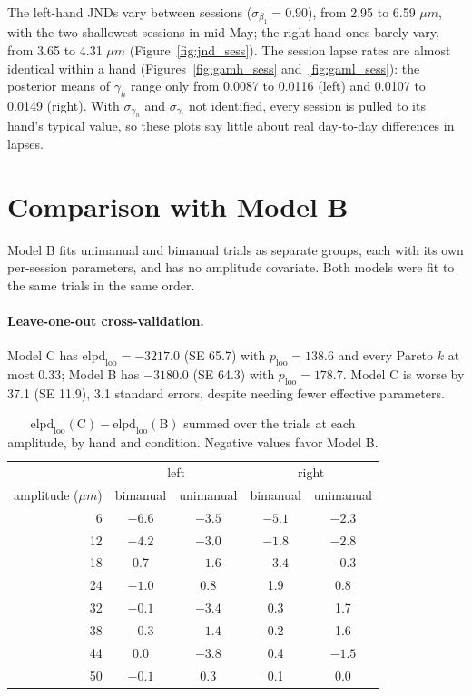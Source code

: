 \documentclass[11pt]{article}
\begin{document}
The left-hand JNDs vary between sessions ($\sigma_{\beta_1} = 0.90$), from 2.95 to
6.59 $\mu m$, with the two shallowest sessions in mid-May; the right-hand ones barely
vary, from 3.65 to 4.31 $\mu m$ (Figure~\ref{fig:jnd_sess}). The session lapse rates
are almost identical within a hand (Figures~\ref{fig:gamh_sess}
and~\ref{fig:gaml_sess}): the posterior means of $\gamma_h$ range only from 0.0087 to
0.0116 (left) and 0.0107 to 0.0149 (right). With $\sigma_{\gamma_h}$ and
$\sigma_{\gamma_l}$ not identified, every session is pulled to its hand's typical
value, so these plots say little about real day-to-day differences in lapses.

\section{Comparison with Model B}

Model B fits unimanual and bimanual trials as separate groups, each with its own
per-session parameters, and has no amplitude covariate. Both models were fit to the
same trials in the same order.

\paragraph{Leave-one-out cross-validation.}
Model C has $\text{elpd}_\text{loo} = -3217.0$ (SE 65.7) with $p_\text{loo} = 138.6$ and
every Pareto $k$ at most 0.33; Model B has $-3180.0$ (SE 64.3) with
$p_\text{loo} = 178.7$. Model C is worse by 37.1 (SE 11.9), 3.1 standard errors,
despite needing fewer effective parameters.

\begin{table}[H]
\centering
\caption{$\text{elpd}_\text{loo}(\text{C}) - \text{elpd}_\text{loo}(\text{B})$ summed over the
trials at each amplitude, by hand and condition. Negative values favor Model B.}
\label{tab:loo}
\begin{tabular}{rcccc}
\toprule
 & \multicolumn{2}{c}{left} & \multicolumn{2}{c}{right} \\
amplitude ($\mu m$) & bimanual & unimanual & bimanual & unimanual \\
\midrule
6  & $-6.6$ & $-3.5$ & $-5.1$ & $-2.3$ \\
12 & $-4.2$ & $-3.0$ & $-1.8$ & $-2.8$ \\
18 & 0.7 & $-1.6$ & $-3.4$ & $-0.3$ \\
24 & $-1.0$ & 0.8 & 1.9 & 0.8 \\
32 & $-0.1$ & $-3.4$ & 0.3 & 1.7 \\
38 & $-0.3$ & $-1.4$ & 0.2 & 1.6 \\
44 & 0.0 & $-3.8$ & 0.4 & $-1.5$ \\
50 & $-0.1$ & 0.3 & 0.1 & 0.0 \\
\bottomrule
\end{tabular}
\end{table}
\end{document}
